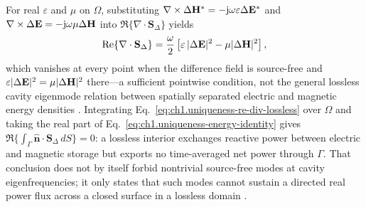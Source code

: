 For real $\varepsilon$ and $\mu$ on $\Omega$, substituting $\nabla\times\Delta\mathbf{H}^*=-\mathrm{j}\omega\varepsilon\Delta\mathbf{E}^*$ and $\nabla\times\Delta\mathbf{E}=-\mathrm{j}\omega\mu\Delta\mathbf{H}$ into $\Re\{\nabla\cdot\mathbf{S}_\Delta\}$ yields
\begin{equation}
\label{eq:ch1.uniqueness-re-div-lossless}
\Re\{\nabla\cdot\mathbf{S}_\Delta\}=\frac{\omega}{2}\left[\varepsilon\,|\Delta\mathbf{E}|^{2}-\mu|\Delta\mathbf{H}|^{2}\right],
\end{equation}
which vanishes at every point when the difference field is source-free and $\varepsilon|\Delta\mathbf{E}|^2=\mu|\Delta\mathbf{H}|^2$ there---a sufficient pointwise condition, not the general lossless cavity eigenmode relation between spatially separated electric and magnetic energy densities \cite{stratton1941,harrington2001}. Integrating Eq.~\eqref{eq:ch1.uniqueness-re-div-lossless} over $\Omega$ and taking the real part of Eq.~\eqref{eq:ch1.uniqueness-energy-identity} gives $\Re\{\int_{\Gamma}\hat{\mathbf{n}}\cdot\mathbf{S}_\Delta\,dS\}=0$: a lossless interior exchanges reactive power between electric and magnetic storage but exports no time-averaged net power through $\Gamma$. That conclusion does not by itself forbid nontrivial source-free modes at cavity eigenfrequencies; it only states that such modes cannot sustain a directed real power flux across a closed surface in a lossless domain \cite{stratton1941,sommerfeld1949}.

